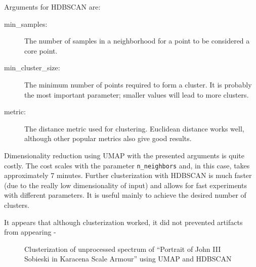 Arguments for HDBSCAN are:
\begin{description}
    \item[min\_samples:] The number of samples in a neighborhood for a point to be considered a core point.
    \item[min\_cluster\_size:] The minimum number of points required to form a cluster. It is probably the most important parameter; smaller values will lead to more clusters.
    \item[metric:] The distance metric used for clustering. Euclidean distance works well, although other popular metrics also give good results.
\end{description}

Dimensionality reduction using UMAP with the presented arguments is quite costly. 
The cost scales with the parameter \texttt{n\_neighbors} and, in this case, takes approximately 7 minutes. 
Further clusterization with HDBSCAN is much faster (due to the really low dimensionality of input) and allows for fast experiments with different parameters. 
It is useful mainly to achieve the desired number of clusters.

It appears that although clusterization worked, it did not prevented artifacts from appearing - 
\begin{figure}[H] 
  \centering     
   
  \caption{Clusterization of unprocessed spectrum of ``Portrait of John III Sobieski in Karacena Scale Armour'' using UMAP and HDBSCAN}
  \label{fig:sobieski_clustered_som_noise}
\end{figure}